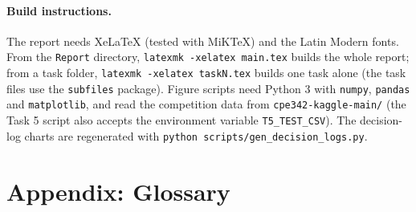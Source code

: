 \paragraph{Build instructions.} The report needs XeLaTeX (tested with MiKTeX) and the Latin Modern fonts. From the \texttt{Report} directory, \texttt{latexmk -xelatex main.tex} builds the whole report; from a task folder, \texttt{latexmk -xelatex taskN.tex} builds one task alone (the task files use the \texttt{subfiles} package). Figure scripts need Python 3 with \texttt{numpy}, \texttt{pandas} and \texttt{matplotlib}, and read the competition data from \texttt{cpe342-kaggle-main/} (the Task 5 script also accepts the environment variable \texttt{T5\_TEST\_CSV}). The decision-log charts are regenerated with \texttt{python scripts/gen\_decision\_logs.py}.

\section{Appendix: Glossary}
\label{sec:glossary}

